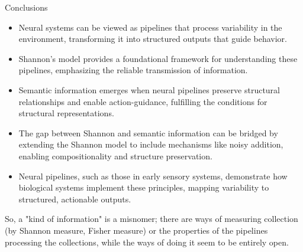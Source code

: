\documentclass[10pt, aspectratio=169, handout]{beamer}
\begin{document}
    \begin{frame}[label=conclusions2 ]{Conclusions}

    \begin{itemize}
        \item Neural systems can be viewed as pipelines that process variability in the environment, transforming it into structured outputs that guide behavior.
        \item Shannon's model provides a foundational framework for understanding these pipelines, emphasizing the reliable transmission of information.
        \item Semantic information emerges when neural pipelines preserve structural relationships and enable action-guidance, fulfilling the conditions for structural representations.
        \item The gap between Shannon and semantic information can be bridged by extending the Shannon model to include mechanisms like noisy addition, enabling compositionality and structure preservation.
        \item Neural pipelines, such as those in early sensory systems, demonstrate how biological systems implement these principles, mapping variability to structured, actionable outputs.
    \end{itemize}

\end{frame}

 
\begin{frame}

    \begin{center}
        So, a "kind of information" is a misnomer; there are ways of measuring collection (by Shannon measure, Fisher measure) or the properties of the pipelines processing the collections, while the ways of doing it seem to be entirely open.
    \end{center}

    

\end{frame}
\end{document}

